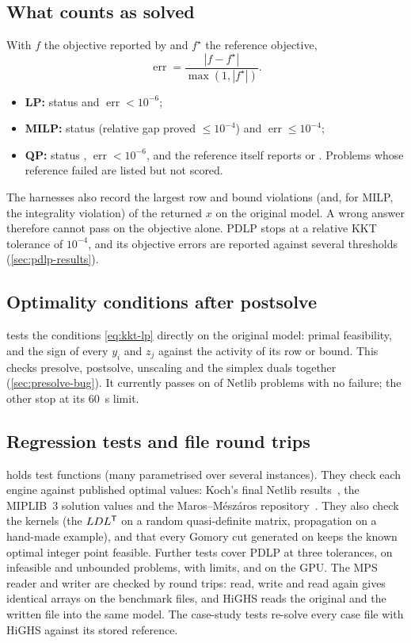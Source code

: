 \subsection{What counts as solved}
With $f$ the objective reported by \nirnay{} and $f^\star$ the reference objective,
\begin{equation}\label{eq:relerr}
  \operatorname{err} = \frac{|f-f^\star|}{\max(1,|f^\star|)} .
\end{equation}
\begin{itemize}
  \item \textbf{LP:} status  and $\operatorname{err}<10^{-6}$;
  \item \textbf{MILP:} status  (relative gap proved $\le10^{-4}$) and
        $\operatorname{err}\le10^{-4}$;
  \item \textbf{QP:} status , $\operatorname{err}<10^{-6}$, and the reference itself
        reports  or . Problems whose reference failed are listed but
        not scored.
\end{itemize}
The harnesses also record the largest row and bound violations (and, for MILP, the integrality
violation) of the returned $x$ on the original model. A wrong answer therefore cannot pass on the
objective alone. PDLP stops at a relative KKT tolerance of $10^{-4}$, and its objective errors are reported
against several thresholds (\cref{sec:pdlp-results}).

\subsection{Optimality conditions after postsolve}
 tests the conditions \eqref{eq:kkt-lp} directly on the original model: primal
feasibility, and the sign of every $y_i$ and $z_j$ against the activity of its row or bound.
This checks presolve, postsolve, unscaling and the simplex duals together
(\cref{sec:presolve-bug}).
\ifnum{} It currently passes on \nDualOk{} of \nDualTot{} Netlib problems with no
failure; the other \nDualStatus{} stop at its \SI{60}{s} limit.\fi

\subsection{Regression tests and file round trips}
 holds \nTestFunctions{} test functions (many parametrised over several instances). They
check each engine against published optimal values: Koch's final Netlib results~\cite{koch2004}, the
MIPLIB~3 solution values and the Maros--Mészáros repository~\cite{maros1999}. They also check the
kernels (the $LDL^{\mathsf{T}}$ on a random quasi-definite matrix, propagation on a hand-made example), and
that every Gomory cut generated on  keeps the known optimal integer point feasible.
Further tests cover PDLP at three tolerances, on infeasible and unbounded problems, with limits, and
on the GPU. The MPS reader and writer are checked by round trips: read, write and read again gives
identical arrays on the benchmark files, and HiGHS reads the original and the written file into the
same model. The case-study tests re-solve every case file with HiGHS against its stored reference.


